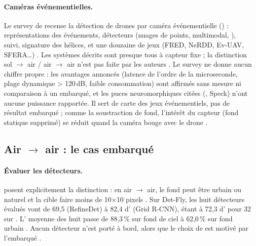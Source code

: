 \paragraph{Caméras événementielles.} Le survey de
\citet{arxiv-2508.04564-drone-detection-event-cameras}\pp{} recense la détection de
drones par caméra événementielle () : représentations des événements, détecteurs
(nuages de points,  multimodal, ), suivi, signature des hélices, et une douzaine
de jeux (FRED, NeRDD, Ev-UAV, SFERA…) . Les systèmes décrits sont
presque tous à capteur fixe ; la distinction sol $\rightarrow$ air / air $\rightarrow$ air
n'est pas faite par les auteurs \deduit. Le survey ne donne aucun chiffre propre : les
avantages annoncés (latence de l'ordre de la microseconde, plage dynamique > 120\,dB,
faible consommation) sont affirmés  sans mesure ni comparaison à un  embarqué, et les
puces neuromorphiques citées (, Speck) n'ont aucune puissance rapportée.
Il sert de carte des jeux événementiels, pas de résultat embarqué ; comme la soustraction
de fond, l'intérêt du capteur (fond statique supprimé) se réduit quand la caméra bouge
avec le drone \deduit.

\subsection{Air $\rightarrow$ air : le cas embarqué}

\paragraph{Évaluer les détecteurs.} \citet{2021-zheng-air-air-visual-detection-micro}
posent explicitement la distinction : en air $\rightarrow$ air, le fond peut être urbain
ou naturel et la cible faire moins de 10$\times$10 pixels . Sur Det-Fly, les huit
détecteurs évalués vont de 69,5 (RefineDet) à 82,4 d' (Grid R-CNN),  étant à
72,3 d' pour 32\, sur  \med. L' moyenne des huit passe de
88,3\,\% sur fond de ciel à 62,0\,\% sur fond urbain . Aucun détecteur n'est
porté à bord, alors que le choix de  est motivé par l'embarqué .

